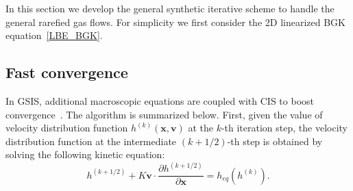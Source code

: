 In this section we develop the general synthetic iterative scheme to handle the general rarefied gas flows. For simplicity we first consider the 2D linearized BGK equation~\eqref{LBE_BGK}. 

\subsection{Fast convergence}

In GSIS, additional macroscopic equations are coupled with CIS to boost convergence~\cite{SuArXiv2019}. The algorithm is summarized below. First, given the value of velocity distribution function $h^{(k)}(\bm{x},\bm{v})$ at the $k$-th iteration step, the velocity distribution function at the intermediate $(k+1/2)$-th step is obtained by solving the following kinetic equation: 
\begin{equation}\label{LBE_iteration_2}
h^{(k+1/2)}+
K\bm{v}\cdot\frac{\partial
	{h}^{(k+1/2)}}{\partial{\bm{x}}}=h_{eq}(h^{(k)}).
\end{equation}


